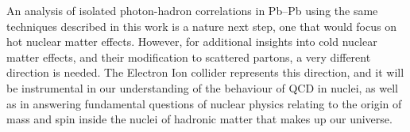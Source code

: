 An analysis of isolated photon-hadron correlations in Pb--Pb using the same techniques described in this work is a nature next step, one that would focus on hot nuclear matter effects. However, for additional insights into cold nuclear matter effects, and their modification to scattered partons, a very different direction is needed. The Electron Ion collider represents this direction, and it will be instrumental in our understanding of the behaviour of QCD in nuclei, as well as in answering fundamental questions of nuclear physics relating to the origin of mass and spin inside the nuclei of hadronic matter that makes up our universe.



